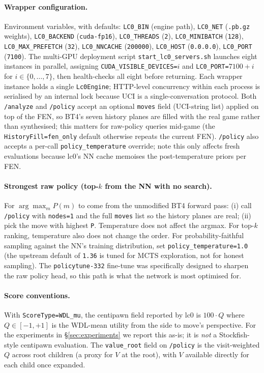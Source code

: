 \paragraph{Wrapper configuration.}
Environment variables, with defaults: \texttt{LC0\_BIN} (engine path), \texttt{LC0\_NET} (\texttt{.pb.gz} weights), \texttt{LC0\_BACKEND} (\texttt{cuda-fp16}), \texttt{LC0\_THREADS} (\texttt{2}), \texttt{LC0\_MINIBATCH} (\texttt{128}), \texttt{LC0\_MAX\_PREFETCH} (\texttt{32}), \texttt{LC0\_NNCACHE} (\texttt{200000}), \texttt{LC0\_HOST} (\texttt{0.0.0.0}), \texttt{LC0\_PORT} (\texttt{7100}). The multi-GPU deployment script \texttt{start\_lc0\_servers.sh} launches eight instances in parallel, assigning \texttt{CUDA\_VISIBLE\_DEVICES=}$i$ and \texttt{LC0\_PORT=}$7100+i$ for $i\in\{0,\ldots,7\}$, then health-checks all eight before returning. Each wrapper instance holds a single \texttt{Lc0Engine}; HTTP-level concurrency within each process is serialised by an internal lock because UCI is a single-conversation protocol. Both \texttt{/analyze} and \texttt{/policy} accept an optional \texttt{moves} field (UCI-string list) applied on top of the FEN, so BT4's seven history planes are filled with the real game rather than synthesised; this matters for raw-policy queries mid-game (the \texttt{HistoryFill=fen\_only} default otherwise repeats the current FEN). \texttt{/policy} also accepts a per-call \texttt{policy\_temperature} override; note this only affects fresh evaluations because lc0's NN cache memoises the post-temperature priors per FEN.

\paragraph{Strongest raw policy (top-$k$ from the NN with no search).}
For $\arg\max_m P(m)$ to come from the unmodified BT4 forward pass: (i) call \texttt{/policy} with \texttt{nodes=1} and the full \texttt{moves} list so the history planes are real; (ii) pick the move with highest \texttt{P}. Temperature does not affect the argmax. For top-$k$ ranking, temperature also does not change the order. For probability-faithful sampling against the NN's training distribution, set \texttt{policy\_temperature=1.0} (the upstream default of \texttt{1.36} is tuned for MCTS exploration, not for honest sampling). The \texttt{policytune-332} fine-tune was specifically designed to sharpen the raw policy head, so this path is what the network is most optimised for.

\paragraph{Score conventions.}
With \texttt{ScoreType=WDL\_mu}, the centipawn field reported by lc0 is $100\!\cdot\!Q$ where $Q\in[-1,+1]$ is the WDL-mean utility from the side to move's perspective. For the experiments in \S\ref{sec:experiments} we report this as-is; it is \emph{not} a Stockfish-style centipawn evaluation. The \texttt{value\_root} field on \texttt{/policy} is the visit-weighted $Q$ across root children (a proxy for $V$ at the root), with $V$ available directly for each child once expanded.


